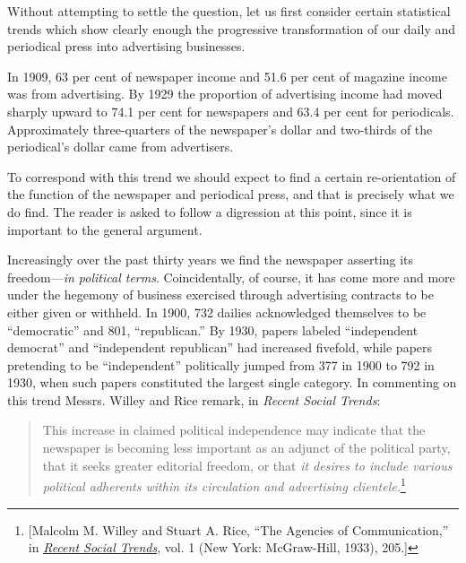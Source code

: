 \documentclass[twoside,nohyper,openany,nobib]{tufte-book}
\begin{document}
Without attempting to settle the question, let us first consider certain
statistical trends which show clearly enough the progressive
transformation of our daily and periodical press into advertising
businesses.

In 1909, 63 per cent of newspaper income and 51.6 per cent of magazine
income was from advertising. By 1929 the proportion of advertising
income had moved sharply upward to 74.1 per cent for newspapers and 63.4
per cent for periodicals. Approximately three-quarters of the
newspaper's dollar and two-thirds of the periodical's dollar came from
advertisers.

To correspond with this trend we should expect to find a certain
re-orientation of the function of the newspaper and periodical press,
and that is precisely what we do find. The reader is asked to follow a
digression at this point, since it is important to the general argument.

Increasingly over the past thirty years we find the newspaper asserting
its freedom---\emph{in political terms}. Coincidentally, of course, it
has come more and more under the hegemony of business exercised through
advertising contracts to be either given or withheld. In 1900, 732
dailies acknowledged themselves to be ``democratic'' and 801,
``republican.'' By 1930, papers labeled ``independent democrat'' and
``independent republican'' had increased fivefold, while papers
pretending to be ``independent'' politically jumped from 377 in 1900 to
792 in 1930, when such papers constituted the largest single category.
In commenting on this trend Messrs. Willey and Rice remark, in
\emph{Recent Social Trends}:

\begin{quote}
This increase in claimed political independence may indicate that the
newspaper is becoming less important as an adjunct of the political
party, that it seeks greater editorial freedom, or that \emph{it desires
to include various political adherents within its circulation and
advertising clientele.}\footnote{{[}Malcolm M. Willey and Stuart A. Rice, ``The Agencies of
  Communication,'' in
  \emph{\href{http://www.worldcat.org/oclc/544930}{Recent Social
  Trends}}, vol. 1 (New York: McGraw-Hill, 1933), 205.{]}}
\end{quote}
\end{document}
